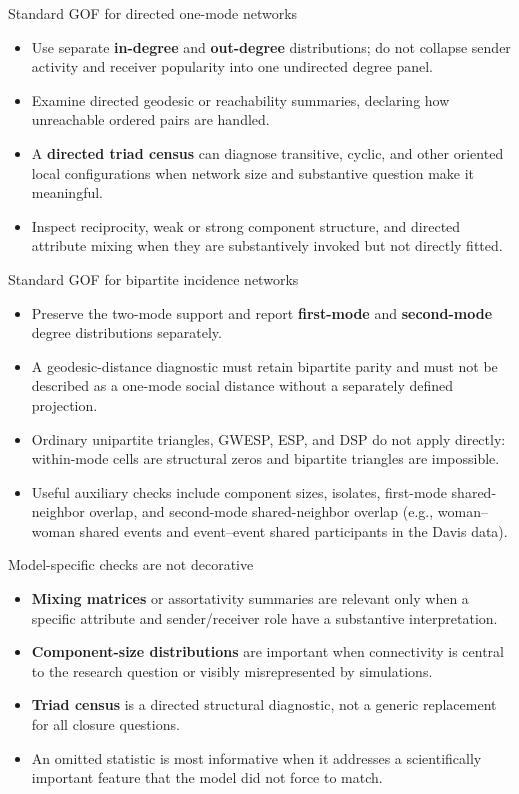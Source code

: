 \documentclass[aspectratio=169,11pt]{beamer}
\newcommand{\term}[1]{\textbf{\color{nupurple}#1}}
\begin{document}
\begin{frame}{Standard GOF for directed one-mode networks}
\begin{itemize}
\item Use separate \term{in-degree} and \term{out-degree} distributions; do not collapse sender activity and receiver popularity into one undirected degree panel.
\item Examine directed geodesic or reachability summaries, declaring how unreachable ordered pairs are handled.
\item A \term{directed triad census} can diagnose transitive, cyclic, and other oriented local configurations when network size and substantive question make it meaningful.
\item Inspect reciprocity, weak or strong component structure, and directed attribute mixing when they are substantively invoked but not directly fitted.
\end{itemize}
\end{frame}

\begin{frame}{Standard GOF for bipartite incidence networks}
\begin{itemize}
\item Preserve the two-mode support and report \term{first-mode} and \term{second-mode} degree distributions separately.
\item A geodesic-distance diagnostic must retain bipartite parity and must not be described as a one-mode social distance without a separately defined projection.
\item Ordinary unipartite triangles, GWESP, ESP, and DSP do not apply directly: within-mode cells are structural zeros and bipartite triangles are impossible.
\item Useful auxiliary checks include component sizes, isolates, first-mode shared-neighbor overlap, and second-mode shared-neighbor overlap (e.g., woman--woman shared events and event--event shared participants in the Davis data).
\end{itemize}
\end{frame}

\begin{frame}{Model-specific checks are not decorative}
\begin{itemize}
\item \term{Mixing matrices} or assortativity summaries are relevant only when a specific attribute and sender/receiver role have a substantive interpretation.
\item \term{Component-size distributions} are important when connectivity is central to the research question or visibly misrepresented by simulations.
\item \term{Triad census} is a directed structural diagnostic, not a generic replacement for all closure questions.
\item An omitted statistic is most informative when it addresses a scientifically important feature that the model did not force to match.
\end{itemize}
\end{frame}
\end{document}
